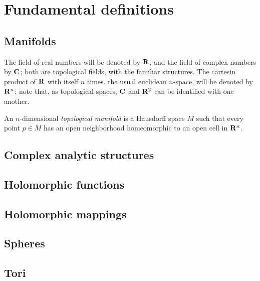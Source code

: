 \chapter{Fundamental definitions}
\section{Manifolds}
The field of real numbers will be denoted by $\mathbf{R}$, and the field of complex numbers by $\mathbf{C}$; both are topological fields, with the familiar structures. The cartesin product of $\mathbf{R}$ with itself $n$ times. the usual euclidean $n$-space, will be denoted by $\mathbf{R}^n$; note that, as topological spaces, $\mathbf{C}$ and $\mathbf{R}^2$ can be identified with one another.

\begin{definition}
An $n$-dimensional {\it topological manifold} is a Hausdorff space $M$ such that every point $p\in M$ has an open neighborhood homeomorphic to an open cell in $\mathbf{R}^n$.
\end{definition}


\section{Complex analytic structures}
\section{Holomorphic functions}
\section{Holomorphic mappings}
\section{Spheres}
\section{Tori}


